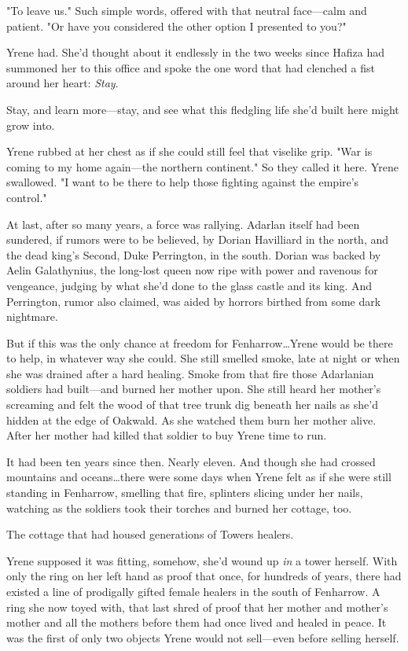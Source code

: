 "To leave us."
Such simple words, offered with that neutral face---calm and patient.
"Or have you considered the other option I presented to you?"

Yrene had.
She'd thought about it endlessly in the two weeks since Hafiza had summoned her to this office and spoke the one word that had clenched a fist around her heart: \emph{Stay}.

Stay, and learn more---stay, and see what this fledgling life she'd built here might grow into.

Yrene rubbed at her chest as if she could still feel that viselike grip.
"War is coming to my home again---the northern continent."
So they called it here.
Yrene swallowed.
"I want to be there to help those fighting against the empire's control."

At last, after so many years, a force was rallying.
Adarlan itself had been sundered, if rumors were to be believed, by Dorian Havilliard in the north, and the dead king's Second, Duke Perrington, in the south.
Dorian was backed by Aelin Galathynius, the long-lost queen now ripe with power and ravenous for vengeance, judging by what she'd done to the glass castle and its king.
And Perrington, rumor also claimed, was aided by horrors birthed from some dark nightmare.

But if this was the only chance at freedom for Fenharrow\ldots Yrene would be there to help, in whatever way she could.
She still smelled smoke, late at night or when she was drained after a hard healing.
Smoke from that fire those Adarlanian soldiers had built---and burned her mother upon.
She still heard her mother's screaming and felt the wood of that tree trunk dig beneath her nails as she'd hidden at the edge of Oakwald.
As she watched them burn her mother alive.
After her mother had killed that soldier to buy Yrene time to run.

It had been ten years since then.
Nearly eleven.
And though she had crossed mountains and oceans\ldots there were some days when Yrene felt as if she were still standing in Fenharrow, smelling that fire, splinters slicing under her nails, watching as the soldiers took their torches and burned her cottage, too.

The cottage that had housed generations of Towers healers.

Yrene supposed it was fitting, somehow, she'd wound up \emph{in} a tower herself.
With only the ring on her left hand as proof that once, for hundreds of years, there had existed a line of prodigally gifted female healers in the south of Fenharrow.
A ring she now toyed with, that last shred of proof that her mother and mother's mother and all the mothers before them had once lived and healed in peace.
It was the first of only two objects Yrene would not sell---even before selling herself.

